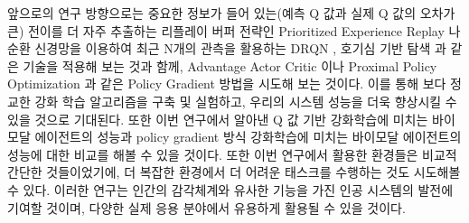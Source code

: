\documentclass[oneside, under, ko]{snuthesis}
\begin{document}
앞으로의 연구 방향으로는 중요한 정보가 들어 있는(예측 Q 값과 실제 Q 값의 오차가 큰) 전이를 더 자주 추출하는 리플레이 버퍼 전략인 Prioritized Experience Replay \cite{per}나 순환 신경망을 이용하여 최근 N개의 관측을 활용하는 DRQN \cite{POMDP}, 호기심 기반 탐색 \cite{curious}과 같은 기술을 적용해 보는 것과 함께, Advantage Actor Critic \cite{A2C}이나 Proximal Policy Optimization \cite{PPO}과 같은 Policy Gradient 방법을 시도해 보는 것이다. 이를 통해 보다 정교한 강화 학습 알고리즘을 구축 및 실험하고, 우리의 시스템 성능을 더욱 향상시킬 수 있을 것으로 기대된다. 또한 이번 연구에서 알아낸 Q 값 기반 강화학습에 미치는 바이모달 에이전트의 성능과 policy gradient 방식 강화학습에 미치는 바이모달 에이전트의 성능에 대한 비교를 해볼 수 있을 것이다. 또한 이번 연구에서 활용한 환경들은 비교적 간단한 것들이었기에, 더 복잡한 환경에서 더 어려운 태스크를 수행하는 것도 시도해볼 수 있다. 이러한 연구는 인간의 감각체계와 유사한 기능을 가진 인공 시스템의 발전에 기여할 것이며, 다양한 실제 응용 분야에서 유용하게 활용될 수 있을 것이다.
\end{document}
